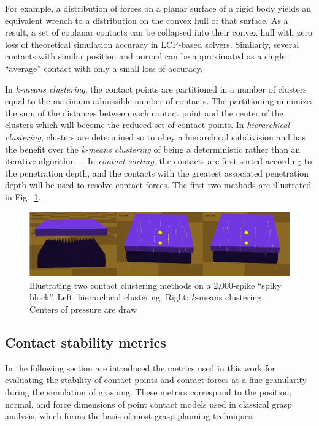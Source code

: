 For example, a distribution of forces on a planar surface of a rigid body yields an equivalent wrench to a distribution on the convex hull of that surface. As a result, a set of coplanar contacts can be collapsed into their convex hull with zero loss of theoretical simulation accuracy in LCP-based solvers.  Similarly, several contacts with similar position and normal can be approximated as a single ``average'' contact with only a small loss of accuracy.

In \emph{k-means clustering}, the contact points are partitioned in a number of clusters equal to the maximum admissible number of contacts. The partitioning minimizes the sum of the distances between each contact point and the center of the clusters which will become the reduced set of contact points.
In \emph{hierarchical clustering}, clusters are determined so to obey a hierarchical subdivision and has the benefit over the \emph{k-means clustering} of being a deterministic rather than an iterative algorithm ~\cite{Rokach10}.
In \emph{contact sorting}, the contacts are first sorted according to the penetration depth, and the contacts with the greatest associated penetration depth will be used to resolve contact forces. The first two methods are illustrated in Fig.~\ref{fig:clustering}.


\begin{figure}[!hbt]
\begin{center}
        \includegraphics[width=0.95\columnwidth]     {images/ssoch/clustering}
        \caption{Illustrating two contact clustering methods on a 2,000-spike ``spiky block''. Left: hierarchical clustering.  Right: $k$-means clustering. Centers of pressure are draw}
        \label{fig:clustering}
        \end{center}
\end{figure}


\subsection{Contact stability metrics}
\label{sec:contact-stability-metrics}

In the following section are introduced the metrics used in this work for evaluating the stability of contact points and contact forces at a fine granularity during the simulation of grasping.  These metrics correspond to the position, normal, and force dimensions of point contact models used in classical grasp analysis, which forms the basis of most grasp planning techniques.

